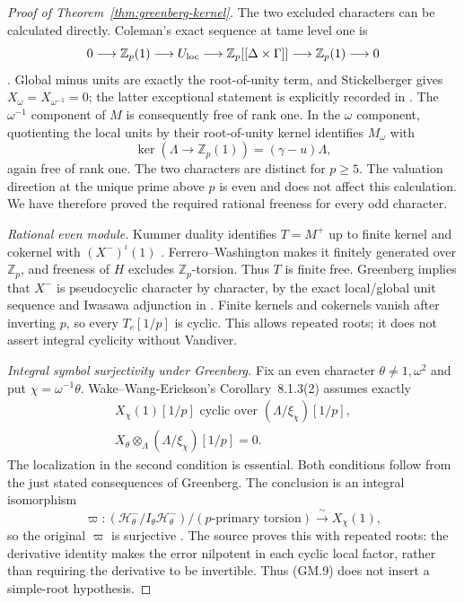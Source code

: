 \begin{proof}[Proof of Theorem~\ref{thm:greenberg-kernel}]
The two excluded characters can be calculated directly.
Coleman's exact sequence at tame level one is
\[
 0\longrightarrow\mathbb Z_p(1)\longrightarrow U_{\rm loc}
 \longrightarrow\mathbb Z_p[[\Delta\times\Gamma]]
 \longrightarrow\mathbb Z_p(1)\longrightarrow0
\]
\cite[Theorem~5.5.31, p.~148; Proposition~6.1.1,
pp.~151--152]{SharifiIwasawaNotes}.
Global minus units are exactly the root-of-unity term, and
Stickelberger gives $X_\omega=X_{\omega^{-1}}=0$; the latter
exceptional statement is explicitly recorded in
\cite[proof of Lemma~5.2.7, p.~13]{WakeWangErickson2017}.
The $\omega^{-1}$ component of $M$ is consequently free of rank
one. In the $\omega$ component, quotienting the local units by
their root-of-unity kernel identifies $M_\omega$ with
\[
 \ker(\Lambda\longrightarrow\mathbb Z_p(1))
     =(\gamma-u)\Lambda,
\]
again free of rank one. The two characters are distinct for
$p\ge5$. The valuation direction at the unique prime above $p$
is even and does not affect this calculation. We have therefore
proved the required rational freeness for every odd character.

\emph{Rational even module.}
Kummer duality identifies $T=M^+$ up to finite kernel and cokernel
with $(X^-)^\iota(1)$
\cite[Proposition~3.4.7 and Corollary~3.4.8,
p.~92]{SharifiIwasawaNotes}.
Ferrero--Washington makes it finitely generated over $\mathbb Z_p$,
and freeness of $H$ excludes $\mathbb Z_p$-torsion. Thus $T$ is
finite free. Greenberg implies that $X^-$ is pseudocyclic
character by character, by the exact local/global unit sequence and
Iwasawa adjunction in
\cite[Corollary~2.1.3 and Conjecture~2.1.5 with the following
explanation, p.~8]{WakeWangEricksonPseudo2018}.
Finite kernels and cokernels vanish after inverting $p$, so every
$T_e[1/p]$ is cyclic. This allows repeated roots; it does not assert
integral cyclicity without Vandiver.

\emph{Integral symbol surjectivity under Greenberg.}
Fix an even character $\theta\ne1,\omega^2$ and put
$\chi=\omega^{-1}\theta$. Wake--Wang-Erickson's
Corollary~8.1.3(2) assumes exactly
\[
 \begin{gathered}
 X_\chi(1)[1/p]\text{ cyclic over }(\Lambda/\xi_\chi)[1/p],\\
 X_\theta\otimes_\Lambda(\Lambda/\xi_\chi)[1/p]=0.
 \end{gathered}                                            \tag{GM.8}
\]
The localization in the second condition is essential.
Both conditions follow from the just stated consequences of
Greenberg. The conclusion is an integral isomorphism
\[
 \varpi:(\mathcal H^-_\theta/I_\theta\mathcal H^-_\theta)
           /(p\text{-primary torsion})
       \xrightarrow{\ \sim\ }X_\chi(1),                    \tag{GM.9}
\]
so the original $\varpi$ is surjective
\cite[Corollary~8.1.3 and complete proof,
pp.~48--49]{WakeWangEricksonPseudo2018}.
The source proves this with repeated roots: the derivative identity
makes the error nilpotent in each cyclic local factor, rather than
requiring the derivative to be invertible. Thus (GM.9) does not
insert a simple-root hypothesis.


\end{proof}
